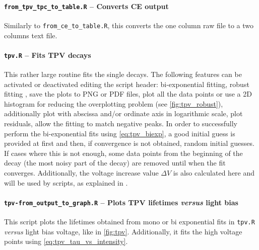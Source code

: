		\paragraph{\texttt{from\_tpv\_tpc\_to\_table.R} -- Converts CE output}
		Similarly to \texttt{from\_ce\_to\_table.R}, this converts the one column raw file to a two columns text file.

		\paragraph{\texttt{tpv.R} -- Fits TPV decays}
		This rather large routine fits the single  decays.
		The following features can be activated or deactivated editing the script header:
		bi-exponential fitting, robust fitting \cite{Maechler2018}, save the plots to PNG or PDF files, plot all the data points or use a 2D histogram for reducing the overplotting problem (see \cref{fig:tpv_robust}), additionally plot with abscissa and/or ordinate axis in logarithmic scale, plot residuals, allow the fitting to match negative peaks.
		In order to successfully perform the bi-exponential fits using \cref{eq:tpv_biexp}, a good initial guess is provided at first and then, if convergence is not obtained, random initial guesses.
		If cases where this is not enough, some data points from the beginning of the decay (the most noisy part of the decay) are removed until when the fit converges.
		Additionally, the voltage increase value $\Delta V$ is also calculated here and will be used by  scripts, as explained in .
		
%		
%				
		\paragraph{\texttt{tpv-\-from\_output\_to\_graph.R} -- Plots TPV lifetimes \textsl{versus} light bias}
		This script plots the lifetimes obtained from mono or bi exponential fits in \texttt{tpv.R} \textsl{versus} light bias voltage, like in \cref{fig:tpv}.
		Additionally, it fits the high voltage points using \cref{eq:tpv_tau_vs_intensity}.
%		
%
